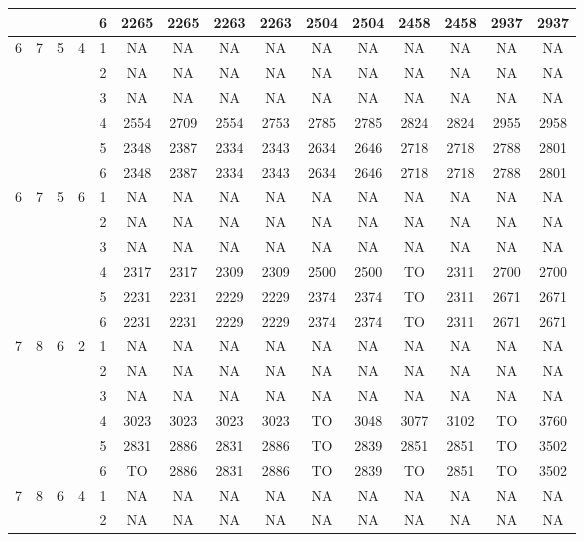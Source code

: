 \begin{longtable}{|c|c|c|c|c|c c|c c|c c|c c|c c|}
 & & & & 6 & 2265 & 2265 & 2263 & 2263 & 2504 & 2504 & 2458 & 2458 & 2937 & 2937 \\
\hline
\multirow{6}{*}{6} & \multirow{6}{*}{7} & \multirow{6}{*}{5} & \multirow{6}{*}{4} & 1 & NA & NA & NA & NA & NA & NA & NA & NA & NA & NA \\
 & & & & 2 & NA & NA & NA & NA & NA & NA & NA & NA & NA & NA \\
 & & & & 3 & NA & NA & NA & NA & NA & NA & NA & NA & NA & NA \\
 & & & & 4 & 2554 & 2709 & 2554 & 2753 & 2785 & 2785 & 2824 & 2824 & 2955 & 2958 \\
 & & & & 5 & 2348 & 2387 & 2334 & 2343 & 2634 & 2646 & 2718 & 2718 & 2788 & 2801 \\
 & & & & 6 & 2348 & 2387 & 2334 & 2343 & 2634 & 2646 & 2718 & 2718 & 2788 & 2801 \\
\hline
\multirow{6}{*}{6} & \multirow{6}{*}{7} & \multirow{6}{*}{5} & \multirow{6}{*}{6} & 1 & NA & NA & NA & NA & NA & NA & NA & NA & NA & NA \\
 & & & & 2 & NA & NA & NA & NA & NA & NA & NA & NA & NA & NA \\
 & & & & 3 & NA & NA & NA & NA & NA & NA & NA & NA & NA & NA \\
 & & & & 4 & 2317 & 2317 & 2309 & 2309 & 2500 & 2500 & TO & 2311 & 2700 & 2700 \\
 & & & & 5 & 2231 & 2231 & 2229 & 2229 & 2374 & 2374 & TO & 2311 & 2671 & 2671 \\
 & & & & 6 & 2231 & 2231 & 2229 & 2229 & 2374 & 2374 & TO & 2311 & 2671 & 2671 \\
\hline
\multirow{6}{*}{7} & \multirow{6}{*}{8} & \multirow{6}{*}{6} & \multirow{6}{*}{2} & 1 & NA & NA & NA & NA & NA & NA & NA & NA & NA & NA \\
 & & & & 2 & NA & NA & NA & NA & NA & NA & NA & NA & NA & NA \\
 & & & & 3 & NA & NA & NA & NA & NA & NA & NA & NA & NA & NA \\
 & & & & 4 & 3023 & 3023 & 3023 & 3023 & TO & 3048 & 3077 & 3102 & TO & 3760 \\
 & & & & 5 & 2831 & 2886 & 2831 & 2886 & TO & 2839 & 2851 & 2851 & TO & 3502 \\
 & & & & 6 & TO & 2886 & 2831 & 2886 & TO & 2839 & TO & 2851 & TO & 3502 \\
\hline
\multirow{6}{*}{7} & \multirow{6}{*}{8} & \multirow{6}{*}{6} & \multirow{6}{*}{4} & 1 & NA & NA & NA & NA & NA & NA & NA & NA & NA & NA \\
 & & & & 2 & NA & NA & NA & NA & NA & NA & NA & NA & NA & NA \\

\end{longtable}

